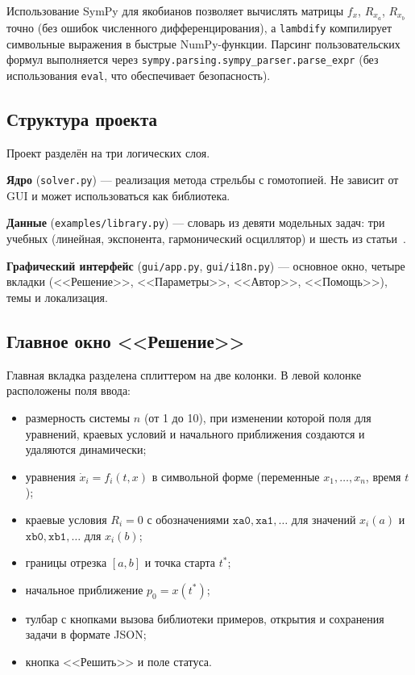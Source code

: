 \documentclass[12pt]{article}
\begin{document}
Использование SymPy для якобианов позволяет вычислять матрицы $f_x$, $R_{x_a}$, $R_{x_b}$ точно (без ошибок численного дифференцирования), а \texttt{lambdify} компилирует символьные выражения в быстрые NumPy-функции. Парсинг пользовательских формул выполняется через \texttt{sympy.parsing.sympy\_parser.parse\_expr} (без использования \texttt{eval}, что обеспечивает безопасность).

\subsection{Структура проекта}

Проект разделён на три логических слоя.

\textbf{Ядро} (\texttt{solver.py}) --- реализация метода стрельбы с гомотопией. Не зависит от GUI и может использоваться как библиотека.

\textbf{Данные} (\texttt{examples/library.py}) --- словарь из девяти модельных задач: три учебных (линейная, экспонента, гармонический осциллятор) и шесть из статьи~\cite{avvakumov-kiselev-2006}.

\textbf{Графический интерфейс} (\texttt{gui/app.py}, \texttt{gui/i18n.py}) --- основное окно, четыре вкладки (<<Решение>>, <<Параметры>>, <<Автор>>, <<Помощь>>), темы и локализация.

\subsection{Главное окно <<Решение>>}

Главная вкладка разделена сплиттером на две колонки. В левой колонке расположены поля ввода:
\begin{itemize}
  \item размерность системы $n$ (от 1 до 10), при изменении которой поля для уравнений, краевых условий и начального приближения создаются и удаляются динамически;
  \item уравнения $\dot{x}_i = f_i(t, x)$ в символьной форме (переменные $x_1, \ldots, x_n$, время $t$);
  \item краевые условия $R_i = 0$ с обозначениями $\texttt{xa0}, \texttt{xa1}, \ldots$ для значений $x_i(a)$ и $\texttt{xb0}, \texttt{xb1}, \ldots$ для $x_i(b)$;
  \item границы отрезка $[a, b]$ и точка старта $t^*$;
  \item начальное приближение $p_0 = x(t^*)$;
  \item тулбар с кнопками вызова библиотеки примеров, открытия и сохранения задачи в формате JSON;
  \item кнопка <<Решить>> и поле статуса.
\end{itemize}
\end{document}
